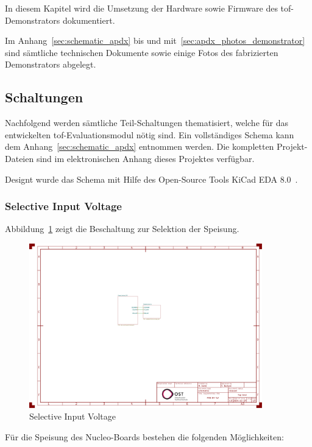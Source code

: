 In diesem Kapitel wird die Umsetzung der Hardware sowie Firmware des \acrshort{tof}-Demonstrators dokumentiert.

Im Anhang~\ref{sec:schematic_apdx} bis und mit~\ref{sec:apdx_photos_demonstrator} sind sämtliche technischen Dokumente
sowie einige Fotos des fabrizierten Demonstrators abgelegt.

\subsection{Schaltungen}
Nachfolgend werden sämtliche Teil-Schaltungen thematisiert, welche für das entwickelten \acrshort{tof}-Evaluationsmodul
nötig sind. Ein vollständiges Schema kann dem Anhang~\ref{sec:schematic_apdx} entnommen werden. Die kompletten
Projekt-Dateien sind im elektronischen Anhang dieses Projektes verfügbar.

Designt wurde das Schema mit Hilfe des Open-Source Tools \dq KiCad EDA 8.0\dq\ \cite{kicad2025kicadeda}.

\subsubsection{Selective Input Voltage}

Abbildung~\ref{fig:selective_input_voltage} zeigt die Beschaltung zur Selektion der Speisung.

\begin{figure}[H]
    \centering
    \includegraphics[page=2, trim=80 590 750 50, clip, width=0.9\textwidth]{attachments/schematic.pdf}
    \caption{Selective Input Voltage}\label{fig:selective_input_voltage}
\end{figure}

Für die Speisung des Nucleo-Boards bestehen die folgenden Möglichkeiten:

